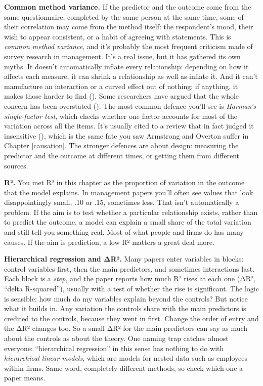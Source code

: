 \documentclass[
]{book}
\begin{document}
\textbf{Common method variance.} If the predictor and the outcome come from the same questionnaire, completed by the same person at the same time, some of their correlation may come from the method itself: the respondent's mood, their wish to appear consistent, or a habit of agreeing with statements. This is \emph{common method variance}, and it's probably the most frequent criticism made of survey research in management. It's a real issue, but it has gathered its own myths. It doesn't automatically inflate every relationship: depending on how it affects each measure, it can shrink a relationship as well as inflate it. And it can't manufacture an interaction or a curved effect out of nothing; if anything, it makes those harder to find (). Some researchers have argued that the whole concern has been overstated (). The most common defence you'll see is \emph{Harman's single-factor test}, which checks whether one factor accounts for most of the variation across all the items. It's usually cited to a review that in fact judged it insensitive (), which is the same fate you saw Armstrong and Overton suffer in Chapter \ref{causation}. The stronger defences are about design: measuring the predictor and the outcome at different times, or getting them from different sources.

\textbf{R².} You met R² in this chapter as the proportion of variation in the outcome that the model explains. In management papers you'll often see values that look disappointingly small, .10 or .15, sometimes less. That isn't automatically a problem. If the aim is to test whether a particular relationship exists, rather than to predict the outcome, a model can explain a small share of the total variation and still tell you something real. Most of what people and firms do has many causes. If the aim is prediction, a low R² matters a great deal more.

\textbf{Hierarchical regression and ΔR².} Many papers enter variables in blocks: control variables first, then the main predictors, and sometimes interactions last. Each block is a \emph{step}, and the paper reports how much R² rises at each one (ΔR², ``delta R-squared''), usually with a test of whether the rise is significant. The logic is sensible: how much do my variables explain beyond the controls? But notice what it builds in. Any variation the controls share with the main predictors is credited to the controls, because they went in first. Change the order of entry and the ΔR² changes too. So a small ΔR² for the main predictors can say as much about the controls as about the theory. One naming trap catches almost everyone: ``hierarchical regression'' in this sense has nothing to do with \emph{hierarchical linear models}, which are models for nested data such as employees within firms. Same word, completely different methods, so check which one a paper means.
\end{document}
